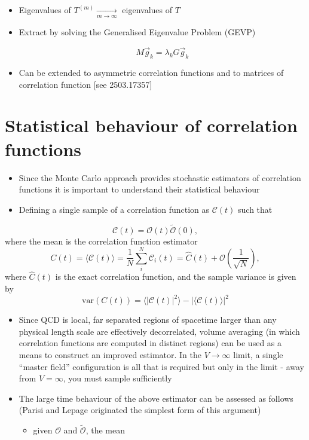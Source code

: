 \begin{itemize}
  \item Eigenvalues of \(T^{(m)} \underset{m \rightarrow \infty}{\rightarrow}\) eigenvalues of \(T\)
  \item Extract by solving the Generalised Eigenvalue Problem (GEVP)

\begin{equation}
M \vec{g}_{k}=\lambda_{k} G \vec{g}_{k}
\end{equation}

  \item Can be extended to asymmetric correlation functions and to matrices of correlation function [see 2503.17357]
\end{itemize}


\section{Statistical behaviour of correlation functions}
\begin{itemize}
    \item Since the Monte Carlo approach provides stochastic estimators of correlation functions it is important to understand their statistical behaviour
    \item Defining a single sample of a correlation function as $\mathcal{C}(t)$ such that 
\end{itemize}
\begin{equation}
    \mathcal{C}(t) = \mathcal{O}(t)\tilde{\mathcal{O}}(0),
\end{equation}
where the mean is the correlation function estimator
\begin{equation}
    C(t) = \langle \mathcal{C}(t) \rangle = \frac{1}{N}\sum_i^N \mathcal{C}_i(t) = \hat{C}(t) + \mathcal{O}\left(\frac{1}{\sqrt{N}}\right),
\end{equation}
where $\hat{C}(t)$ is the exact correlation function, and the sample variance is given by
\begin{equation}
    \text{var}(C(t)) = \langle | \mathcal{C}(t)|^2 \rangle - |\langle \mathcal{C}(t) \rangle | ^2
\end{equation}
\begin{itemize}
    \item Since QCD is local, far separated regions of spacetime larger than any physical length scale are effectively decorrelated, volume averaging (in which correlation functions are computed in distinct regions) can be used as a means to construct an improved estimator. In the $V \rightarrow \infty$ limit, a single ``master field'' configuration is all that is required but only in the limit - away from $V = \infty$, you must sample sufficiently
    \item The large time behaviour of the above estimator can be assessed as follows (Parisi and Lepage originated the simplest form of this argument)
    \begin{itemize}
        \item given $\mathcal{O}$ and $\tilde{\mathcal{O}}$, the mean
    \end{itemize}
\end{itemize}

